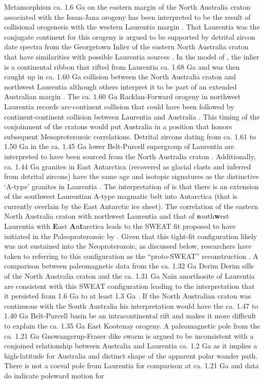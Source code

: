 \documentclass[twocolumn, switch]{article} %
\begin{document}
Metamorphism ca. 1.6 Ga on the eastern margin of the North Australia craton associated with the Issan-Jana orogeny has been interpreted to be the  result of collisional orogenesis with the western Laurentia margin \citep{Nordsvan2018a, Pourteau2018a, Gibson2020a}. That Laurentia was the conjugate continent for this orogeny is argued to be supported by detrital zircon date spectra from the Georgetown Inlier of the eastern North Australia craton that have similarities with possible Laurentia sources \citep{Nordsvan2018a}. In the model of \cite{Nordsvan2018a}, the inlier is a continental ribbon that rifted from Laurentia ca. 1.68 Ga and was then caught up in ca. 1.60 Ga collision between the North Australia craton and northwest Laurentia although others interpret it to be part of an extended Australian margin \citep{Gibson2020a}. The ca. 1.60 Ga Racklan-Forward orogeny in northwest Laurentia records arc-continent collision that could have been followed by continent-continent collision between Laurentia and Australia \citep{Thorkelson2005a, Furlanetto2013a}. This timing of the conjoinment of the cratons would put Australia in a position that honors subsequent Mesoproterozoic correlations. Detrital zircons dating from ca. 1.61 to 1.50 Ga in the ca. 1.45 Ga lower Belt-Purcell supergroup of Laurentia are interpreted to have been sourced from the North Australia craton \citep{Jones2015a}. Additionally, ca. 1.44 Ga granites in East Antarctica (recovered as glacial clasts and inferred from detrital zircons) have the same age and isotopic signatures as the distinctive `A-type' granites in Laurentia \citep{Goodge2008a}. The interpretation of \cite{Goodge2008a, Goodge2017a} is that there is an extension of the southwest Laurentian A-type magmatic belt into Antarctica (that is currently overlain by the East Antarctic ice sheet). The correlation of the eastern North Australia craton with northwest Laurentia and that of \textbf{s}outh\textbf{w}est Laurentia with \textbf{E}ast \textbf{A}n\textbf{t}arctica leads to the SWEAT fit proposed to have initiated in the Paleoproterozoic by \cite{Moores1991a}. Given that this tight-fit configuration likely was not sustained into the Neoproterozoic, as discussed below, researchers have taken to referring to this configuration as  the ``proto-SWEAT'' reconstruction \citep{Payne2009b, Kirscher2020a}. A comparison between paleomagnetic data from the ca. 1.32 Ga Derim Derim sills of the North Australia craton and the ca. 1.31 Ga Nain anorthosite of Laurentia are consistent with this SWEAT configuration leading to the interpretation that it persisted from 1.6 Ga to at least 1.3 Ga \citep{Kirscher2020a}. If the North Australian craton was continuous with the South Australia his interpretation would have the ca. 1.47 to 1.40 Ga Belt-Purcell basin be an intracontinental rift and makes it more difficult to explain the ca. 1.35 Ga East Kootenay orogeny. A paleomagnetic pole from the ca. 1.21 Ga Gnowangerup-Fraser dike swarm is argued to be inconsistent with a conjoined relationship between Australia and Laurentia ca. 1.2 Ga as it implies a high-latitude for Australia and distinct shape of the apparent polar wander path\citep{Pisarevsky2014a}. There is not a coeval pole from Laurentia for comparison at ca. 1.21 Ga and data do indicate poleward motion for 
\end{document}

